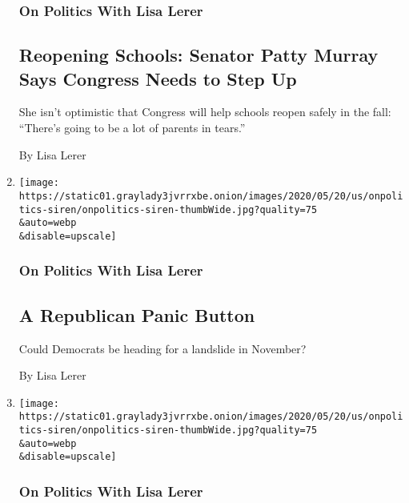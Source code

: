 \begin{enumerate}
  \hypertarget{on-politics-with-lisa-lerer-1}{%
  \subsubsection{On Politics With Lisa
  Lerer}\label{on-politics-with-lisa-lerer-1}}

  \hypertarget{reopening-schools-senator-patty-murray-says-congress-needs-to-step-up}{%
  \subsection{Reopening Schools: Senator Patty Murray Says Congress
  Needs to Step
  Up}\label{reopening-schools-senator-patty-murray-says-congress-needs-to-step-up}}

  She isn't optimistic that Congress will help schools reopen safely in
  the fall: ``There's going to be a lot of parents in tears.''

  By Lisa Lerer
\item
  \href{/2020/07/27/us/politics/a-republican-panic-button.html}{}

  \texttt{[image: https://static01.graylady3jvrrxbe.onion/images/2020/05/20/us/onpolitics-siren/onpolitics-siren-thumbWide.jpg?quality=75\\\&auto=webp\\\&disable=upscale]}

  \hypertarget{on-politics-with-lisa-lerer-2}{%
  \subsubsection{On Politics With Lisa
  Lerer}\label{on-politics-with-lisa-lerer-2}}

  \hypertarget{a-republican-panic-button}{%
  \subsection{A Republican Panic
  Button}\label{a-republican-panic-button}}

  Could Democrats be heading for a landslide in November?

  By Lisa Lerer
\item
  \href{/2020/07/23/us/politics/aoc-women-ted-yoho.html}{}

  \texttt{[image: https://static01.graylady3jvrrxbe.onion/images/2020/05/20/us/onpolitics-siren/onpolitics-siren-thumbWide.jpg?quality=75\\\&auto=webp\\\&disable=upscale]}

  \hypertarget{on-politics-with-lisa-lerer-3}{%
  \subsubsection{On Politics With Lisa
  Lerer}\label{on-politics-with-lisa-lerer-3}}


\end{enumerate}
